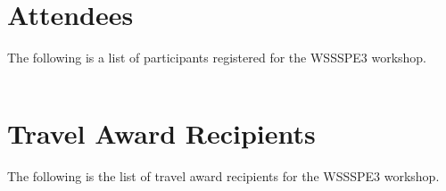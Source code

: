 \documentclass[11pt, oneside]{amsart}
\newcommand{\todo}[1]{{\color{blue}$\blacksquare$~\textsf{[TODO: #1]}}}
\begin{document}
\section{Attendees}  \label{sec:attendees}
The following is a list of participants registered for the WSSSPE3 workshop.

{\scriptsize
\begin{longtable}{lll}

\end{longtable}
}

\section{Travel Award Recipients}  \label{sec:awardees}
The following is the list of travel award recipients for the WSSSPE3 workshop.

{\scriptsize
\begin{longtable}{lll}

\end{longtable}
}




%

%










\end{document}
